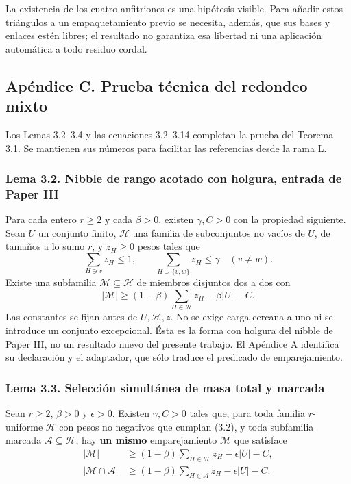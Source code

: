 \documentclass[spanish,11pt,a4paper]{article}
\begin{document}
La existencia de los cuatro anfitriones es una hipótesis visible. Para añadir estos triángulos a un empaquetamiento previo se necesita, además, que sus bases y enlaces estén libres; el resultado no garantiza esa libertad ni una aplicación automática a todo residuo cordal.

\subsection{Apéndice C. Prueba técnica del redondeo mixto}\label{apendice-c.-prueba-tecnica-del-redondeo-mixto}

Los Lemas 3.2--3.4 y las ecuaciones 3.2--3.14 completan la prueba del Teorema 3.1. Se mantienen sus números para facilitar las referencias desde la rama L.

\subsubsection{Lema 3.2. Nibble de rango acotado con holgura, entrada de Paper III}\label{lema-3.2.-nibble-de-rango-acotado-con-holgura-entrada-de-paper-iii}

Para cada entero \(r\ge2\) y cada \(\beta>0\), existen \(\gamma,C>0\) con la propiedad siguiente. Sean \(U\) un conjunto finito, \(\mathcal H\) una familia de subconjuntos no vacíos de \(U\), de tamaños a lo sumo \(r\), y \(z_H\ge0\) pesos tales que \[
\sum_{H\ni v}z_H\le1,\qquad
\sum_{H\supseteq\{v,w\}}z_H\le\gamma\quad(v\ne w).
\tag{3.2}
\] Existe una subfamilia \(\mathcal M\subseteq\mathcal H\) de miembros disjuntos dos a dos con \[
|\mathcal M|\ge(1-\beta)\sum_{H\in\mathcal H}z_H-\beta|U|-C.
\tag{3.3}
\] Las constantes se fijan antes de \(U,\mathcal H,z\). No se exige carga cercana a uno ni se introduce un conjunto excepcional. Ésta es la forma con holgura del nibble de Paper III, no un resultado nuevo del presente trabajo. El Apéndice A identifica su declaración y el adaptador, que sólo traduce el predicado de emparejamiento.

\subsubsection{Lema 3.3. Selección simultánea de masa total y marcada}\label{lema-3.3.-seleccion-simultanea-de-masa-total-y-marcada}

Sean \(r\ge2\), \(\beta>0\) y \(\epsilon>0\). Existen \(\gamma,C>0\) tales que, para toda familia \(r\)-uniforme \(\mathcal H\) con pesos no negativos que cumplan (3.2), y toda subfamilia marcada \(\mathcal A\subseteq\mathcal H\), hay \textbf{un mismo} emparejamiento \(\mathcal M\) que satisface \[
\begin{aligned}
|\mathcal M|&\ge(1-\beta)\sum_{H\in\mathcal H}z_H-\epsilon|U|-C,\\
|\mathcal M\cap\mathcal A|&\ge(1-\beta)\sum_{H\in\mathcal A}z_H-\epsilon|U|-C.
\end{aligned}
\tag{3.4}
\]
\end{document}
